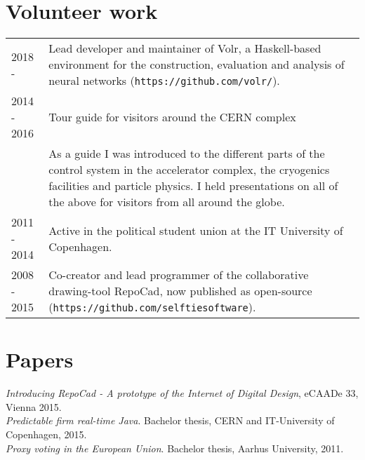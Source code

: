 \documentclass[12pt,a4paper,notitlepage]{article}
\begin{document}

\section*{Volunteer work}
\begin{tabularx}{\textwidth}{l X}
2018 -      & Lead developer and maintainer of Volr, a Haskell-based environment
              for the construction, evaluation and analysis of neural networks
              (\texttt{https://github.com/volr/}). \\
2014 - 2016 & Tour guide for visitors around the CERN complex \\
            & As a guide I was introduced to the different parts of the
              control system in the accelerator complex, the cryogenics
              facilities and particle physics. I held presentations
              on all of the above for visitors from all around the globe. \\
2011 - 2014 & Active in the political student union at the IT University of Copenhagen. \\
2008 - 2015 & Co-creator and lead programmer of the collaborative drawing-tool
              RepoCad, now published as open-source (\texttt{https://github.com/selftiesoftware}).
\end{tabularx}

\section*{Papers}
\textit{Introducing RepoCad  - A prototype of the Internet of Digital Design}, eCAADe 33, Vienna 2015. \\
\textit{Predictable firm real-time Java}. Bachelor thesis, CERN and IT-University of Copenhagen, 2015. \\
\textit{Proxy voting in the European Union}. Bachelor thesis, Aarhus University, 2011.

\end{document}

